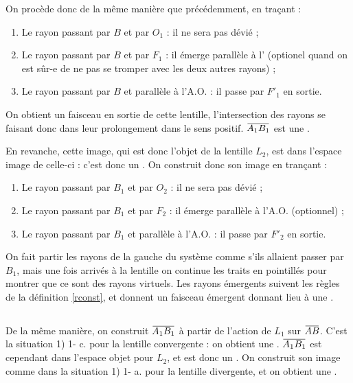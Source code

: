 \documentclass[10pt,a5paper,notitlepage]{book}
\begin{document}
On procède donc de la même manière que précédemment, en traçant :
\begin{enumerate}
    \item Le rayon passant par $B$ et par $O_1$ : il ne sera pas dévié ;
    \item Le rayon passant par $B$ et par $F_1$ : il émerge parallèle à
        l' (optionel quand on est sûr-e de ne pas se
        tromper avec les deux autres rayons) ;
    \item Le rayon passant par $B$ et parallèle à l'A.O. : il passe par $F'_1$
        en sortie.
\end{enumerate}

On obtient un faisceau  en sortie de cette lentille,
l'intersection des rayons se faisant donc dans leur prolongement dans le sens
positif. $\ABa$ est une  . \bigbreak

En revanche, cette image, qui est donc l'objet de la lentille $L_2$, est dans
l'espace image de celle-ci : c'est donc un  . On construit donc son image en trançant :

\begin{enumerate}
    \item Le rayon passant par $B_1$ et par $O_2$ : il ne sera pas dévié ;
    \item Le rayon passant par $B_1$ et par $F_2$ : il émerge parallèle à l'A.O.
        (optionnel) ;
    \item Le rayon passant par $B_1$ et parallèle à l'A.O. : il passe par $F'_2$
        en sortie.
\end{enumerate}

On fait partir les rayons de la gauche du système comme s'ils allaient passer
par $B_1$, mais une fois arrivés à la lentille on continue les traits en
pointillés pour montrer que ce sont des rayons virtuels. Les rayons émergents
suivent les règles de la définition \ref{rconst}, et donnent un faisceau
émergent  donnant lieu à une .

\subsection{}
De la même manière, on construit $\ABa$ à partir de l'action de $L_1$ sur $\ABb$.
C'est la situation 1) 1- c. pour la lentille convergente : on obtient une
 . $\ABa$ est cependant dans l'espace
objet pour $L_2$, et est donc un  . On
construit son image comme dans la situation 1) 1- a. pour la lentille
divergente, et on obtient une .
\end{document}
